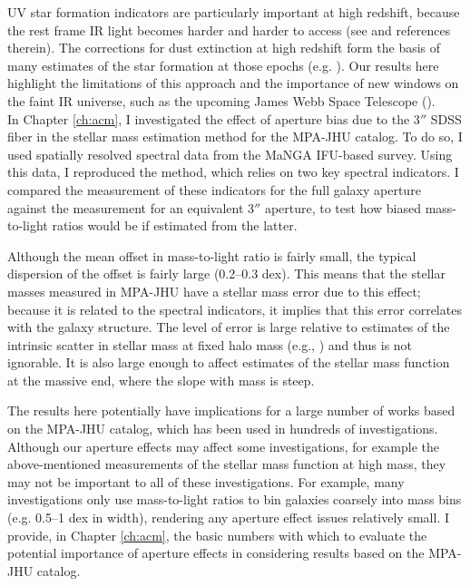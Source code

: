 UV star formation indicators are particularly important
at high redshift, because the rest frame IR light becomes
harder and harder to access (see \citealt{madau_cosmic_2014} and 
references therein). The corrections for dust extinction
at high redshift form the basis of many estimates of the
star formation at those epochs (e.g. \citealt{overzier11a}). 
Our results here highlight the limitations of this approach
and the importance of new windows on the faint IR universe,
such as the upcoming James Webb Space Telescope 
(\citealt{gardner06a}).\\

In Chapter \ref{ch:acm}, I investigated the effect of 
aperture bias due to the 3$''$ SDSS fiber in the stellar 
mass estimation method for the MPA-JHU catalog. To do so,
I used spatially resolved spectral data from the MaNGA 
IFU-based survey. Using this data, I reproduced the 
\citet{kauffmann_stellar_2003} method, which relies on two 
key spectral indicators. I compared the measurement
of these indicators for the full galaxy aperture against 
the measurement for an equivalent 3$''$ aperture, to 
test how biased mass-to-light ratios would be if
estimated from the latter.

Although the mean offset in mass-to-light ratio
is fairly small, the typical dispersion of the offset
is fairly large (0.2--0.3 dex). This means that the 
stellar masses measured in MPA-JHU have a stellar mass
error due to this effect; because it is related to 
the spectral indicators, it implies that this error 
correlates with the galaxy structure. The level of 
error is large relative to estimates of the intrinsic
scatter in stellar mass at fixed halo mass (e.g., 
\citealt{tinker17a}) and thus is not ignorable. It is 
also large enough to affect estimates of the stellar
mass function at the massive end, where the slope with
mass is steep.

The results here potentially have implications for 
a large number of works based on the MPA-JHU catalog,
which has been used in hundreds of investigations.
Although our aperture effects may affect some investigations,
for example the above-mentioned measurements of the 
stellar mass function at high mass,
they may not be important to all of these investigations. 
For example, many investigations only use mass-to-light
ratios to bin galaxies coarsely into mass bins
(e.g. 0.5--1 dex in width), rendering
any aperture effect issues relatively small.
I provide, in Chapter \ref{ch:acm}, the basic numbers 
with which to evaluate the potential importance of 
aperture effects in considering results based on the 
MPA-JHU catalog.

